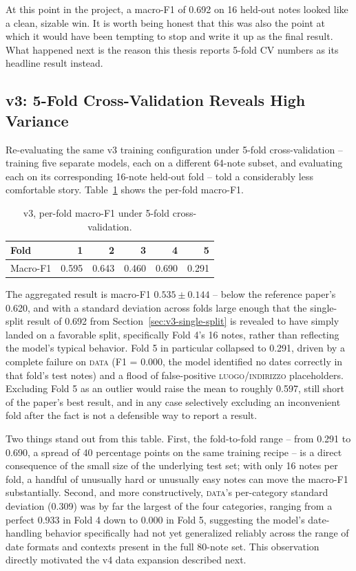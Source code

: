 \documentclass[12pt,a4paper]{report}
\newcommand{\DATA}{\textsc{data}}
\newcommand{\LUOGO}{\textsc{luogo\slash indirizzo}}
\begin{document}
At this point in the project, a macro-F1 of 0.692 on 16 held-out notes looked like a clean, sizable win. It is worth being honest that this was also the point at which it would have been tempting to stop and write it up as the final result. What happened next is the reason this thesis reports 5-fold CV numbers as its headline result instead.

\subsection{v3: 5-Fold Cross-Validation Reveals High Variance}
\label{sec:v3-cv}

Re-evaluating the same v3 training configuration under 5-fold cross-validation -- training five separate models, each on a different 64-note subset, and evaluating each on its corresponding 16-note held-out fold -- told a considerably less comfortable story. Table~\ref{tab:v3-cv-folds} shows the per-fold macro-F1.

\begin{table}[htbp]
\centering
\caption{v3, per-fold macro-F1 under 5-fold cross-validation.}
\label{tab:v3-cv-folds}
\begin{tabular}{lrrrrr}
\toprule
Fold & 1 & 2 & 3 & 4 & 5 \\
\midrule
Macro-F1 & 0.595 & 0.643 & 0.460 & 0.690 & 0.291 \\
\bottomrule
\end{tabular}
\end{table}

The aggregated result is macro-F1 $0.535 \pm 0.144$ -- below the reference paper's 0.620, and with a standard deviation across folds large enough that the single-split result of 0.692 from Section~\ref{sec:v3-single-split} is revealed to have simply landed on a favorable split, specifically Fold 4's 16 notes, rather than reflecting the model's typical behavior. Fold 5 in particular collapsed to 0.291, driven by a complete failure on \DATA{} (F1 = 0.000, the model identified no dates correctly in that fold's test notes) and a flood of false-positive \LUOGO{} placeholders. Excluding Fold 5 as an outlier would raise the mean to roughly 0.597, still short of the paper's best result, and in any case selectively excluding an inconvenient fold after the fact is not a defensible way to report a result.

Two things stand out from this table. First, the fold-to-fold range -- from 0.291 to 0.690, a spread of 40 percentage points on the same training recipe -- is a direct consequence of the small size of the underlying test set; with only 16 notes per fold, a handful of unusually hard or unusually easy notes can move the macro-F1 substantially. Second, and more constructively, \DATA{}'s per-category standard deviation (0.309) was by far the largest of the four categories, ranging from a perfect 0.933 in Fold 4 down to 0.000 in Fold 5, suggesting the model's date-handling behavior specifically had not yet generalized reliably across the range of date formats and contexts present in the full 80-note set. This observation directly motivated the v4 data expansion described next.
\end{document}
